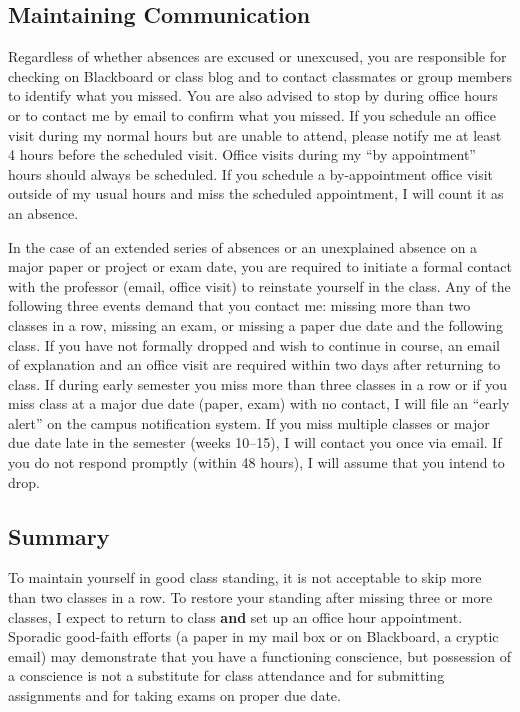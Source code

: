 \documentclass[]{article}
\begin{document}
\subsection{Maintaining Communication}\label{maintaining-communication}

Regardless of whether absences are excused or unexcused, you are
responsible for checking on Blackboard or class blog and to contact
classmates or group members to identify what you missed. You are also
advised to stop by during office hours or to contact me by email to
confirm what you missed. If you schedule an office visit during my
normal hours but are unable to attend, please notify me at least 4 hours
before the scheduled visit. Office visits during my ``by appointment''
hours should always be scheduled. If you schedule a by-appointment
office visit outside of my usual hours and miss the scheduled
appointment, I will count it as an absence.

In the case of an extended series of absences or an unexplained absence
on a major paper or project or exam date, you are required to initiate a
formal contact with the professor (email, office visit) to reinstate
yourself in the class. Any of the following three events demand that you
contact me: missing more than two classes in a row, missing an exam, or
missing a paper due date and the following class. If you have not
formally dropped and wish to continue in course, an email of explanation
and an office visit are required within two days after returning to
class. If during early semester you miss more than three classes in a
row or if you miss class at a major due date (paper, exam) with no
contact, I will file an ``early alert'' on the campus notification
system. If you miss multiple classes or major due date late in the
semester (weeks 10--15), I will contact you once via email. If you do
not respond promptly (within 48 hours), I will assume that you intend to
drop.

\subsection{Summary}\label{summary}

To maintain yourself in good class standing, it is not acceptable to
skip more than two classes in a row. To restore your standing after
missing three or more classes, I expect to return to class \textbf{and}
set up an office hour appointment. Sporadic good-faith efforts (a paper
in my mail box or on Blackboard, a cryptic email) may demonstrate that
you have a functioning conscience, but possession of a conscience is not
a substitute for class attendance and for submitting assignments and for
taking exams on proper due date.
\end{document}
